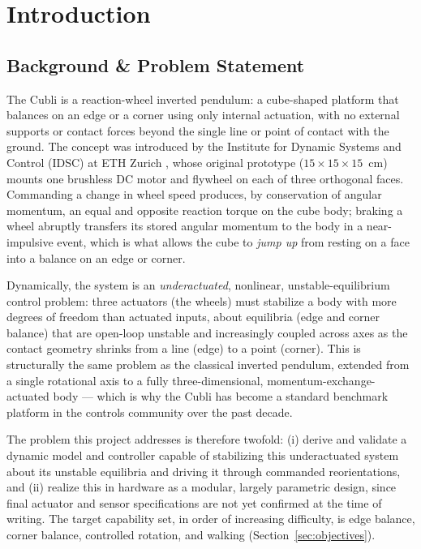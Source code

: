 \section{Introduction}

\subsection{Background \& Problem Statement}
\label{sec:background}

The Cubli is a reaction-wheel inverted pendulum: a cube-shaped platform that balances on an edge or a corner using only internal actuation, with no external supports or contact forces beyond the single line or point of contact with the ground. The concept was introduced by the Institute for Dynamic Systems and Control (IDSC) at ETH Zurich \cite{gajamohan2012cubli, gajamohan2013cubli}, whose original prototype ($15\times15\times15$~cm) mounts one brushless DC motor and flywheel on each of three orthogonal faces. Commanding a change in wheel speed produces, by conservation of angular momentum, an equal and opposite reaction torque on the cube body; braking a wheel abruptly transfers its stored angular momentum to the body in a near-impulsive event, which is what allows the cube to \emph{jump up} from resting on a face into a balance on an edge or corner.

Dynamically, the system is an \emph{underactuated}, nonlinear, unstable-equilibrium control problem: three actuators (the wheels) must stabilize a body with more degrees of freedom than actuated inputs, about equilibria (edge and corner balance) that are open-loop unstable and increasingly coupled across axes as the contact geometry shrinks from a line (edge) to a point (corner). This is structurally the same problem as the classical inverted pendulum, extended from a single rotational axis to a fully three-dimensional, momentum-exchange-actuated body — which is why the Cubli has become a standard benchmark platform in the controls community over the past decade.

The problem this project addresses is therefore twofold: (i) derive and validate a dynamic model and controller capable of stabilizing this underactuated system about its unstable equilibria and driving it through commanded reorientations, and (ii) realize this in hardware as a modular, largely parametric design, since final actuator and sensor specifications are not yet confirmed at the time of writing. The target capability set, in order of increasing difficulty, is edge balance, corner balance, controlled rotation, and walking (Section~\ref{sec:objectives}).

